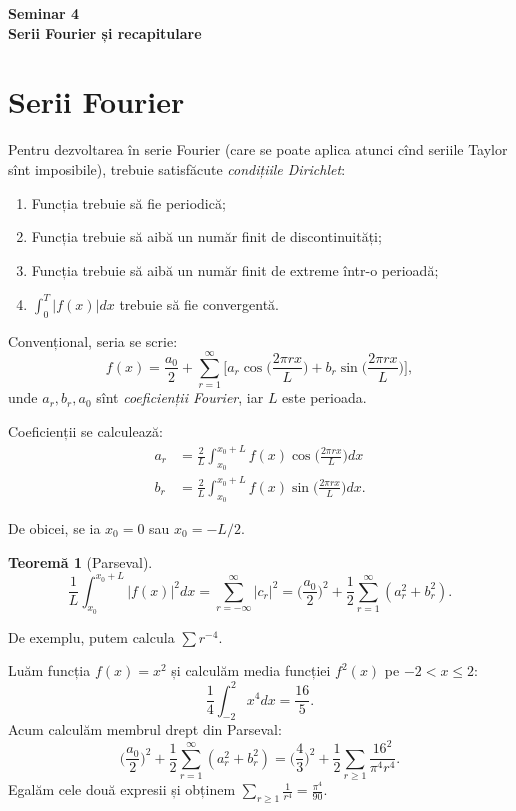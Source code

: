 \documentclass[11pt,a4paper]{article}
\newcommand\ds{\displaystyle}
\theoremstyle{dotless}
\newtheorem{theorem}{Teorem\u{a}}[section]
\theoremstyle{dotlessdr}
\begin{document}

\begin{center}
  {\large\textbf{Seminar 4 \\ Serii Fourier și recapitulare}}
\end{center}

\section{Serii Fourier}
\label{sec:fourier}

Pentru dezvoltarea în serie Fourier (care se poate aplica atunci cînd seriile
Taylor sînt imposibile), trebuie satisfăcute \emph{condițiile Dirichlet}:
\begin{enumerate}[(D1)]
\item Funcția trebuie să fie periodică;
\item Funcția trebuie să aibă un număr finit de discontinuități;
\item Funcția trebuie să aibă un număr finit de extreme într-o perioadă;
\item $\ds\int_0^T |f(x)| dx$ trebuie să fie convergentă.
\end{enumerate}

Convențional, seria se scrie:
\[
  f(x) = \frac{a_0}{2} + \sum_{r = 1}^\infty \Bigg[ a_r \cos \Big( \frac{2\pi rx}{L} \Big) +
  b_r \sin \Big( \frac{2\pi rx}{L} \Big) \Bigg],
\]
unde $a_r, b_r, a_0$ sînt \emph{coeficienții Fourier}, iar $L$ este perioada.

Coeficienții se calculează:
\begin{align*}
  a_r &= \frac{2}{L} \int_{x_0}^{x_0 + L} f(x) \cos \Big( \frac{2\pi rx}{L} \Big) dx \\
  b_r &= \frac{2}{L} \int_{x_0}^{x_0 + L} f(x) \sin \Big( \frac{2\pi rx}{L} \Big) dx.
\end{align*}

De obicei, se ia $x_0 = 0$ sau $x_0 = -L/2$.

\begin{theorem}[Parseval]\label{thm:parseval}
  \[
    \frac{1}{L} \int_{x_0}^{x_0 + L} |f(x)|^2 dx =
    \sum_{r = -\infty}^\infty |c_r|^2 =
    \Big( \frac{a_0}{2} \Big)^2 + \frac{1}{2} \sum_{r = 1}^\infty (a_r^2 + b_r^2).
  \]
\end{theorem}

De exemplu, putem calcula $\sum r^{-4}$.

Luăm funcția $f(x) = x^2$ și calculăm media funcției $f^2(x)$ pe $-2 < x \leq 2$:
\[
  \frac{1}{4} \int_{-2}^2 x^4 dx = \frac{16}{5}.
\]
Acum calculăm membrul drept din Parseval:
\[
  \Big( \frac{a_0}{2} \Big)^2 + \frac{1}{2} \sum_{r = 1}^\infty (a_r^2 + b_r^2) =
  \Big( \frac{4}{3} \Big)^2 + \frac{1}{2} \sum_{r \geq 1} \frac{16^2}{\pi^4 r^4}.
\]
Egalăm cele două expresii și obținem $\sum_{r \geq 1} \frac{1}{r^4} = \frac{\pi^4}{90}$.
\end{document}
